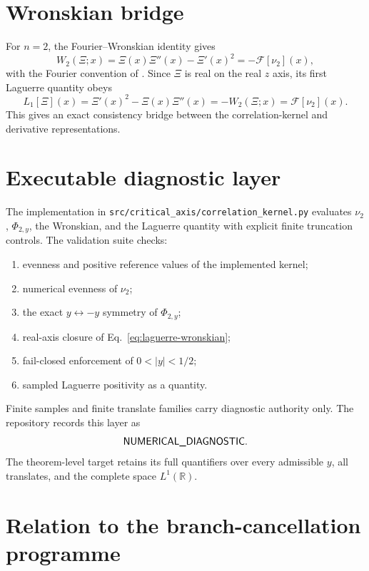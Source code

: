 \section{Wronskian bridge}

For $n=2$, the Fourier--Wronskian identity gives
\begin{equation}\label{eq:dx-wronskian}
W_2(\Xi;x)
=
\Xi(x)\Xi''(x)-\Xi'(x)^2
=
-\mathcal F[\nu_2](x),
\end{equation}
with the Fourier convention of \cite{DimitrovXu2016}.  Since $\Xi$ is real on the real $z$ axis, its first Laguerre quantity obeys
\begin{equation}\label{eq:laguerre-wronskian}
\boxed{
L_1[\Xi](x)
=
\Xi'(x)^2-\Xi(x)\Xi''(x)
=
-W_2(\Xi;x)
=
\mathcal F[\nu_2](x).
}
\end{equation}
This gives an exact consistency bridge between the correlation-kernel and derivative representations.

\section{Executable diagnostic layer}

The implementation in \texttt{src/critical\_axis/correlation\_kernel.py} evaluates $\nu_2$, $\Phi_{2,y}$, the Wronskian, and the Laguerre quantity with explicit finite truncation controls.  The validation suite checks:
\begin{enumerate}[label=(\roman*)]
\item evenness and positive reference values of the implemented kernel;
\item numerical evenness of $\nu_2$;
\item the exact $y\leftrightarrow-y$ symmetry of $\Phi_{2,y}$;
\item real-axis closure of Eq.~\eqref{eq:laguerre-wronskian};
\item fail-closed enforcement of $0<|y|<1/2$;
\item sampled Laguerre positivity as a  quantity.
\end{enumerate}

Finite samples and finite translate families carry diagnostic authority only.  The repository records this layer as
\[
\textsf{NUMERICAL\_DIAGNOSTIC}.
\]
The theorem-level target retains its full quantifiers over every admissible $y$, all translates, and the complete space $L^1(\mathbb R)$.

\section{Relation to the branch-cancellation programme}

